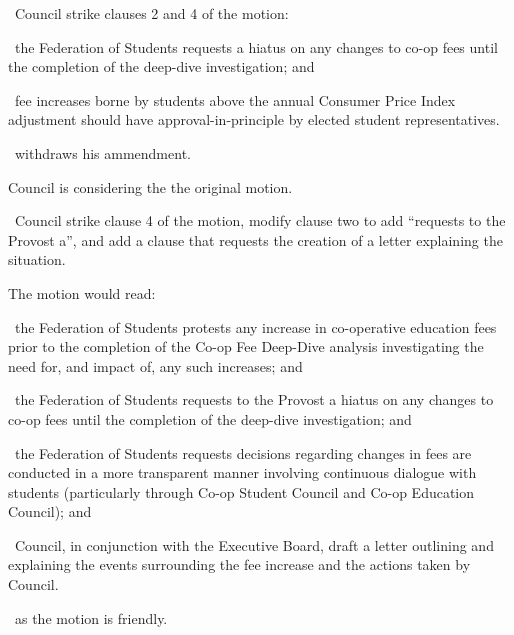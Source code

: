\begin{motion}
    \begin{motion}
        \birt\ Council strike clauses 2 and 4 of the motion:

        \bifrt\ the Federation of Students requests a hiatus on any changes to
        co-op fees until the completion of the deep-dive investigation; and 

        \bifrt\ fee increases borne by students above the annual Consumer Price
        Index adjustment should have approval-in-principle by elected student
        representatives.   
        \movers{\jason}{\andrewc}

        \jason\ withdraws his ammendment.
    \end{motion}

    Council is considering the the original motion. 

    \begin{motion}
        \birt\ Council strike clause 4 of the motion, modify clause two to
        add ``requests to the Provost a'', and add a clause that requests the 
        creation of a letter explaining the situation.        
        \movers{\andrewc}{\seneca}

        The motion would read:

        \begin{motion}
            \birt\ the Federation of Students protests any increase in
            co-operative education fees prior to the completion of the Co-op
            Fee Deep-Dive analysis investigating the need for, and impact of,
            any such increases; and

            \bifrt\ the Federation of Students requests to the Provost a hiatus
            on any changes to co-op fees until the completion of the deep-dive
            investigation; and 

            \bifrt\ the Federation of Students requests decisions regarding
            changes in fees are conducted in a more transparent manner
            involving continuous dialogue with students (particularly through
            Co-op Student Council and Co-op Education Council); and 

            \bifrt\ Council, in conjunction with the Executive Board, draft a 
            letter outlining and explaining the events surrounding the fee 
            increase and the actions taken by Council.
        \end{motion}

        \carries\ as the motion is friendly.


\end{motion}
\end{motion}
